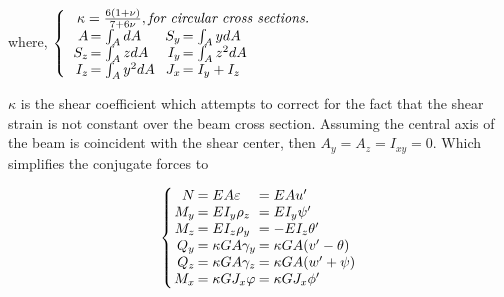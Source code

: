 \begin{center}where, $ \left\{\begin{array}{l}
\ \kappa=\frac{6(1+\nu)}{7+6\nu}, \textit{for circular cross sections.}\\
\arraycolsep=.75pt\begin{array}{rlccccrl}
A&=\int_AdA&&&&&S_y&=\int_A ydA\\
S_z&=\int_AzdA&&&&&I_y&=\int_Az^2dA\\
I_z&=\int_Ay^2dA&&&&&J_x&=I_y+I_z
\end{array}
\end{array}\right. $\\\end{center}
$ \kappa $ is the shear coefficient which attempts to correct for the fact that the shear strain is not constant over the beam cross section. Assuming the central axis of the beam is coincident with the shear center, then $ A_y=A_z=I_{xy}=0 $. Which simplifies the conjugate forces to


\begin{equation}\label{eq:generalizedForcesSimplified}
\left\{\arraycolsep=1pt\begin{array}{rll}
N&=EA\varepsilon&=EAu'\\
M_y&=EI_y\rho_z&=EI_y\psi'\\
M_z&=EI_z\rho_y&=-EI_z\theta'\\
Q_y&=\kappa G A\gamma_y&=\kappa G A(v'-\theta)\\
Q_z&=\kappa G A\gamma_z&=\kappa G A(w'+\psi)\\
M_x&=\kappa G J_x\varphi&=\kappa G J_x\phi'
\end{array}\right.
\end{equation}

